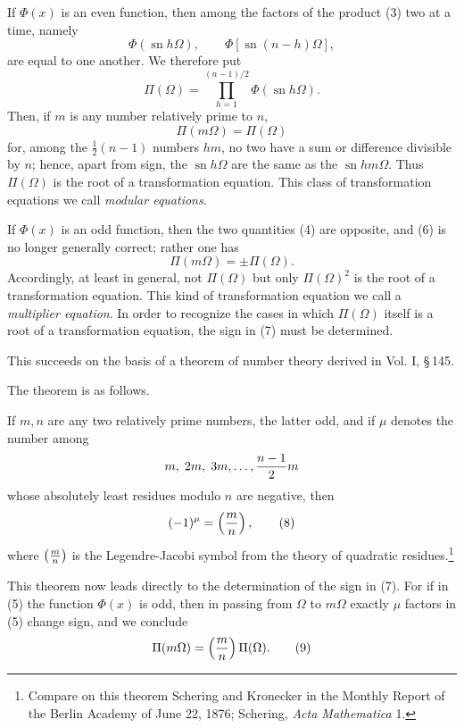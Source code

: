 \documentclass[11pt]{article}
\providecommand{\sn}{\operatorname{sn}}
\begin{document}
If $\Phi(x)$ is an even function, then among the factors of the product (3) two at a time, namely
\begin{equation}
\Phi(\sn h\Omega),\qquad \Phi[\sn(n-h)\Omega],
\tag{4}
\end{equation}
are equal to one another. We therefore put
\begin{equation}
\Pi(\Omega)=\prod_{h=1}^{(n-1)/2}\Phi(\sn h\Omega).
\tag{5}
\end{equation}
Then, if $m$ is any number relatively prime to $n$,
\begin{equation}
\Pi(m\Omega)=\Pi(\Omega)
\tag{6}
\end{equation}
for, among the $\frac12(n-1)$ numbers $hm$, no two have a sum or difference divisible by $n$; hence, apart from sign, the $\sn h\Omega$ are the same as the $\sn hm\Omega$. Thus $\Pi(\Omega)$ is the root of a transformation equation. This class of transformation equations we call \emph{modular equations}.

If $\Phi(x)$ is an odd function, then the two quantities (4) are opposite, and (6) is no longer generally correct; rather one has
\begin{equation}
\Pi(m\Omega)=\pm\Pi(\Omega).
\tag{7}
\end{equation}
Accordingly, at least in general, not $\Pi(\Omega)$ but only $\Pi(\Omega)^2$ is the root of a transformation equation. This kind of transformation equation we call a \emph{multiplier equation}. In order to recognize the cases in which $\Pi(\Omega)$ itself is a root of a transformation equation, the sign in (7) must be determined.

This succeeds on the basis of a theorem of number theory derived in Vol. I, \S\,145.

The theorem is as follows.

If $m,n$ are any two relatively prime numbers, the latter odd, and if $\mu$ denotes the number among
\[
m,\;2m,\;3m,\ldots,{n-1\over2}m
\]
whose absolutely least residues modulo $n$ are negative, then
\begin{equation}
(-1)^\mu=\left({m\over n}\right),
\tag{8}
\end{equation}
where $\left({m\over n}\right)$ is the Legendre-Jacobi symbol from the theory of quadratic residues.\footnote{Compare on this theorem Schering and Kronecker in the Monthly Report of the Berlin Academy of June 22, 1876; Schering, \emph{Acta Mathematica} 1.}

This theorem now leads directly to the determination of the sign in (7). For if in (5) the function $\Phi(x)$ is odd, then in passing from $\Omega$ to $m\Omega$ exactly $\mu$ factors in (5) change sign, and we conclude
\begin{equation}
\Pi(m\Omega)=\left({m\over n}\right)\Pi(\Omega).
\tag{9}
\end{equation}
\end{document}
